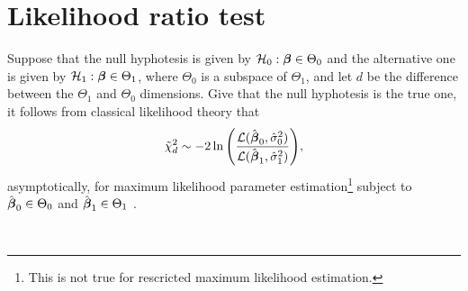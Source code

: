 \documentclass[twocolumn,draft]{article}
\begin{document}
\section{Likelihood ratio test}

Suppose that the null hyphotesis is given by
$\mathcal{H}_0: \boldsymbol{\beta} \in \Theta_0$ and the alternative one is given by
$\mathcal{H}_1: \boldsymbol{\beta} \in \Theta_1$, where $\Theta_0$ is a subspace of $\Theta_1$,
and let $d$ be the difference between the $\Theta_1$ and $\Theta_0 $
dimensions.
Give that the null hyphotesis is the true one,
it follows from classical likelihood theory that
\begin{equation*}
	\tilde{\chi}^2_d \sim -2\ln
	\Bigg(
		\frac{\mathcal{L}(\hat{\boldsymbol{\beta}}_0, \hat\sigma_0^2)}
		     {\mathcal{L}(\hat{\boldsymbol{\beta}}_1, \hat\sigma_1^2)}
	\Bigg),
\end{equation*}
asymptotically, for maximum likelihood parameter estimation\footnote{This is
not true for rescricted maximum likelihood estimation.}
subject to $\hat{\boldsymbol{\beta}}_0 \in \Theta_0$ and $\hat{\boldsymbol{\beta}}_1 \in \Theta_1$
\cite{verbeke2009linear}.

\printbibliography\
\end{document}
